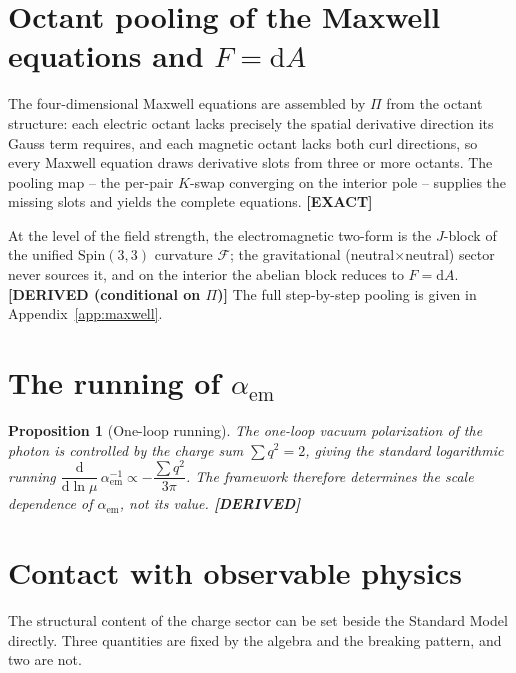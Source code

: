 \documentclass[11pt,oneside]{book}
\newcommand{\dd}{\mathrm{d}}
\newcommand{\Spin}{\mathrm{Spin}}
\newcommand{\Fcal}{\mathcal{F}}
\newcommand{\status}[1]{{\sffamily\bfseries\color{statuscol}[#1]}}
\theoremstyle{plain}
\newtheorem{proposition}[theorem]{Proposition}
\theoremstyle{definition}
\theoremstyle{remark}
\begin{document}
\section{Octant pooling of the Maxwell equations and $F=\dd A$}
\label{sec:maxwell-pooling}

The four-dimensional Maxwell equations are assembled by $\Pi$ from the octant
structure: each electric octant lacks precisely the spatial derivative direction
its Gauss term requires, and each magnetic octant lacks both curl directions, so
every Maxwell equation draws derivative slots from three or more octants. The
pooling map -- the per-pair $K$-swap converging on the interior pole -- supplies
the missing slots and yields the complete equations. \status{EXACT}

At the level of the field strength, the electromagnetic two-form is the $J$-block
of the unified $\Spin(3,3)$ curvature $\Fcal$; the gravitational
(neutral$\times$neutral) sector never sources it, and on the interior the abelian
block reduces to $F=\dd A$. \status{DERIVED (conditional on $\Pi$)} The full
step-by-step pooling is given in Appendix~\ref{app:maxwell}.

\section{The running of $\alpha_{\mathrm{em}}$}
\label{sec:running}

\begin{proposition}[One-loop running]
\label{prop:running}
The one-loop vacuum polarization of the photon is controlled by the charge sum
$\sum q^2=2$, giving the standard logarithmic running
$\dfrac{\dd}{\dd\ln\mu}\,\alpha_{\mathrm{em}}^{-1}\propto-\dfrac{\sum q^2}{3\pi}$.
The framework therefore determines the \emph{scale dependence} of
$\alpha_{\mathrm{em}}$, not its value. \status{DERIVED}
\end{proposition}

\section{Contact with observable physics}
\label{sec:observables}

The structural content of the charge sector can be set beside the Standard Model
directly. Three quantities are fixed by the algebra and the breaking pattern, and
two are not.
\end{document}
